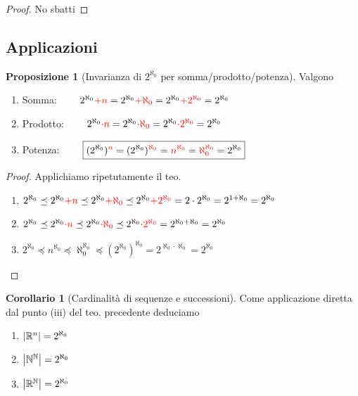 \documentclass[a4paper,10pt]{article}
\theoremstyle{definition}
\newcommand{\na}{\mathbb{N}} %
\newcommand{\re}{\mathbb{R}} %
\theoremstyle{indentdefinition}
\theoremstyle{indentpostulate}
\theoremstyle{indenttheorem}
\newtheorem{prop}{Proposizione}[section]
\newtheorem{cor}{Corollario}[section]
\theoremstyle{myremark}
\theoremstyle{indentgeneral}
\newenvironment{myboxed} 
{\noindent\begin{lrbox}{\mybox}\begin{minipage}{\textwidth}}
{\end{minipage}\end{lrbox}\fbox{\usebox{\mybox}}}
\begin{document}
\begin{proof}
    No sbatti
\end{proof}

\subsection{Applicazioni}

\begin{myboxed}
\begin{prop}[Invarianza di $2^{\aleph_0}$ per somma/prodotto/potenza]
    Valgono
    \begin{enumerate}
        \item Somma: $\qquad 2^{\aleph_0}\textcolor{red}{+n}=2^{\aleph_0}\textcolor{red}{+\aleph_0}=2^{\aleph_0}\textcolor{red}{+2^{\aleph_0}}=2^{\aleph_0}$
        \item Prodotto: $\qquad 2^{\aleph_0}\textcolor{red}{\cdot n}=2^{\aleph_0}\textcolor{red}{\cdot\aleph_0}=2^{\aleph_0}\textcolor{red}{\cdot2^{\aleph_0}}=2^{\aleph_0}$
        \item Potenza: $\qquad \boxed{(2^{\aleph_0})^{\textcolor{red}{n}}=(2^{\aleph_0})^{\textcolor{red}{\aleph_0}}=\textcolor{red}{n^{\aleph_0}}=\textcolor{red}{\aleph_0^{\aleph_0}}=2^{\aleph_0}}$
    \end{enumerate}
\end{prop}
\end{myboxed}

\begin{proof}
    Applichiamo ripetutamente il teo. 
    \begin{enumerate}
        \item $2^{\aleph_0}\preceq 2^{\aleph_0}\textcolor{red}{+n}\preceq2^{\aleph_0}\textcolor{red}{+\aleph_0}\preceq2^{\aleph_0}\textcolor{red}{+2^{\aleph_0}}=2\cdot2^{\aleph_0}=2^{1+\aleph_0}=2^{\aleph_0}$
        
        \item $2^{\aleph_0}\preceq 2^{\aleph_0}\textcolor{red}{\cdot n}\preceq2^{\aleph_0}\textcolor{red}{\cdot\aleph_0}\preceq2^{\aleph_0}\textcolor{red}{\cdot2^{\aleph_0}}=2^{\aleph_0+\aleph_0}=2^{\aleph_0}$
        \item $2^{\aleph_0}\preceq n^{\aleph_0}\preceq \aleph_0^{\aleph_0}\preceq(2^{\aleph_0})^{\aleph_0}=2^{\aleph_0\cdot\aleph_0}=2^{\aleph_0}$
    \end{enumerate}
\end{proof}

\begin{myboxed}
\begin{cor}[Cardinalità di sequenze e successioni]\label{cor-cardinalità-successioni}
    Come applicazione diretta dal punto (iii) del teo. precedente deduciamo
    \begin{enumerate}
        \item $\abs{\re^n}=2^{\aleph_0}$
        \item $\abs{\na^\na}=2^{\aleph_0}$
        \item $\abs{\re^\na}=2^{\aleph_0}$
    \end{enumerate}
\end{cor}
\end{myboxed}
\end{document}

